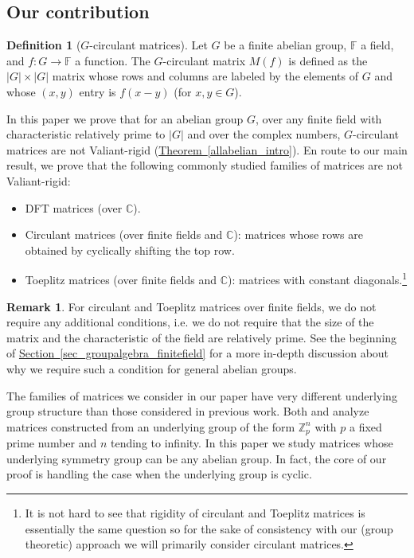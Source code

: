 \documentclass[11pt]{article}
\numberwithin{equation}{section}
\theoremstyle{definition}
\newtheorem{definition}[theorem]{Definition}
\newtheorem{remark}[theorem]{Remark}
\theoremstyle{plain}
\newcommand{\C}{\mathbb C}
\newcommand{\Z}{\mathbb Z}
\newcommand{\expref}[2]{\hyperref[#2]{#1~\ref{#2}}}
\theoremstyle{definition}
\newcommand\F{{\mathbb{F}}}
\renewcommand\Z{{\mathbb{Z}}}
\renewcommand\C{{\mathbb{C}}}
\begin{document}
\subsection{Our contribution} 
%
%
%
\begin{definition}[$G$-circulant matrices]
Let $G$ be a finite abelian group, $\F$ a field, and $f : G\to\F$
a function.  The $G$-circulant matrix $M(f)$ is defined as the
$|G|\times |G|$ matrix whose rows and columns are labeled by
the elements of $G$ and whose $(x,y)$ entry is $f(x-y)$
(for $x,y\in G$).
\end{definition}   %
%
In this paper we prove that for an abelian group $G$, over any finite field with characteristic relatively prime to $|G|$
and over the complex numbers, $G$-circulant matrices %
%
%
%
are not Valiant-rigid (\expref{Theorem}{allabelian_intro}). 
En route to our main result, we prove that the following
commonly studied families of matrices are not Valiant-rigid:
\begin{itemize}
\item  
DFT matrices (over $\C$).   %
%
%
%
%
%
    \item Circulant matrices (over finite fields and $\C$): matrices whose rows are obtained by cyclically shifting the top row.
    \item Toeplitz matrices (over finite fields and $\C$): matrices with constant diagonals.\footnote{It is not hard to see that rigidity of circulant and Toeplitz matrices is essentially the same question so for the sake of consistency with our (group theoretic)  approach we will primarily consider circulant matrices.}
\end{itemize}
\begin{remark}
For circulant and Toeplitz matrices over finite fields, we do not require any additional conditions, i.e. we do not require that the size of the matrix and the characteristic of the field are relatively prime.  See the beginning of \expref{Section}{sec_groupalgebra_finitefield} for a more in-depth discussion about why we require such a condition for general abelian groups.
\end{remark}
The families of matrices we consider in our paper  
have very different underlying group structure than those
considered in previous work.  Both
\cite{old_hadamard} and \cite{CLP}
analyze matrices constructed from an underlying group of the form
$\Z_p^n$ with $p$ a fixed prime number and $n$ tending to infinity.  
In this paper we study matrices whose underlying symmetry group can
be any abelian group.  In fact, the core of our proof is handling the
case when the underlying group is cyclic.
\end{document}
